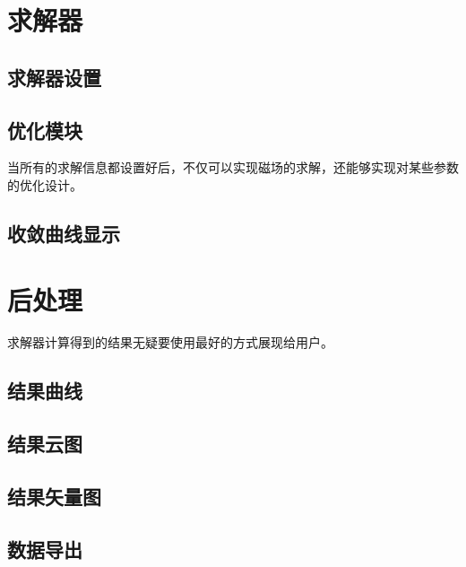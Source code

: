 \section{求解器}

\subsection{求解器设置}

\subsection{优化模块}
当所有的求解信息都设置好后，不仅可以实现磁场的求解，还能够实现对某些参数的优化设计。

\subsection{收敛曲线显示}

\section{后处理}
求解器计算得到的结果无疑要使用最好的方式展现给用户。
\subsection{结果曲线}

\subsection{结果云图}

\subsection{结果矢量图}

\subsection{数据导出}